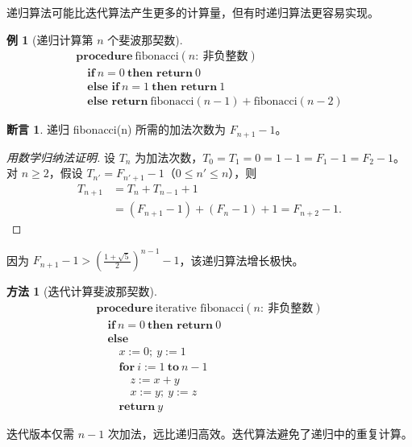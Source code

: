 \documentclass[UTF8,11pt,a4paper]{ctexbook}   %
\theoremstyle{definition}
\newtheorem{example}{例}[section]
\newtheorem{method}{方法}[section]
\newtheorem{proposition}{断言}[section]
\begin{document}
递归算法可能比迭代算法产生更多的计算量，但有时递归算法更容易实现。

\begin{example}[递归计算第 $n$ 个斐波那契数]
\[
\begin{array}{l}
\textbf{procedure}\ \text{fibonacci}(n:\ \text{非负整数})\\
\quad \textbf{if}\ n=0\ \textbf{then return}\ 0\\
\quad \textbf{else if}\ n=1\ \textbf{then return}\ 1\\
\quad \textbf{else return}\ \text{fibonacci}(n-1) + \text{fibonacci}(n-2)
\end{array}
\]
\end{example}

\begin{proposition}
递归 fibonacci(n) 所需的加法次数为 $F_{n+1}-1$。
\end{proposition}

\begin{proof}[用数学归纳法证明]
设 $T_n$ 为加法次数，$T_0=T_1=0 = 1-1 = F_1-1 = F_2-1$。对 $n \geq 2$，假设 $T_{n'} = F_{n'+1}-1$（$0 \leq n' \leq n$），则
\begin{align*}
T_{n+1} &= T_n + T_{n-1} + 1 \\
&= (F_{n+1}-1) + (F_n-1) + 1 = F_{n+2}-1.
\end{align*}
\end{proof}

因为 $F_{n+1}-1 > \left(\frac{1+\sqrt{5}}{2}\right)^{n-1}-1$，该递归算法增长极快。

\begin{method}[迭代计算斐波那契数]
\[
\begin{array}{l}
\textbf{procedure}\ \text{iterative fibonacci}(n:\ \text{非负整数})\\
\quad \textbf{if}\ n=0\ \textbf{then return}\ 0\\
\quad \textbf{else}\\
\quad \quad x := 0;\ y := 1\\
\quad \quad \textbf{for}\ i := 1\ \textbf{to}\ n-1\\
\quad \quad \quad z := x + y\\
\quad \quad \quad x := y;\ y := z\\
\quad \quad \textbf{return}\ y
\end{array}
\]
\end{method}

迭代版本仅需 $n-1$ 次加法，远比递归高效。迭代算法避免了递归中的重复计算。
\end{document}
